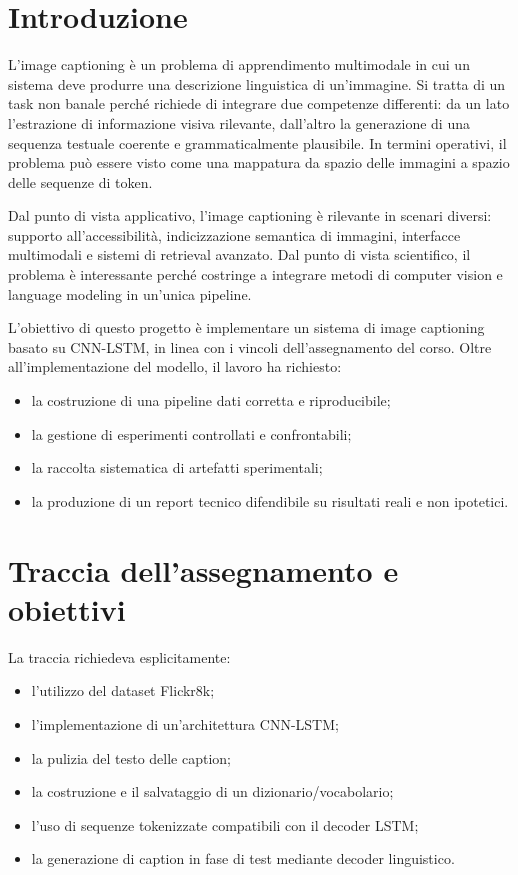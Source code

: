 \documentclass[12pt,a4paper]{article}
\begin{document}
\section{Introduzione}

L'image captioning è un problema di apprendimento multimodale in cui un sistema deve produrre una descrizione linguistica di un'immagine. Si tratta di un task non banale perché richiede di integrare due competenze differenti: da un lato l'estrazione di informazione visiva rilevante, dall'altro la generazione di una sequenza testuale coerente e grammaticalmente plausibile. In termini operativi, il problema può essere visto come una mappatura da spazio delle immagini a spazio delle sequenze di token.

Dal punto di vista applicativo, l'image captioning è rilevante in scenari diversi: supporto all'accessibilità, indicizzazione semantica di immagini, interfacce multimodali e sistemi di retrieval avanzato. Dal punto di vista scientifico, il problema è interessante perché costringe a integrare metodi di computer vision e language modeling in un'unica pipeline.

L'obiettivo di questo progetto è implementare un sistema di image captioning basato su CNN-LSTM, in linea con i vincoli dell'assegnamento del corso. Oltre all'implementazione del modello, il lavoro ha richiesto:
\begin{itemize}[leftmargin=*]
    \item la costruzione di una pipeline dati corretta e riproducibile;
    \item la gestione di esperimenti controllati e confrontabili;
    \item la raccolta sistematica di artefatti sperimentali;
    \item la produzione di un report tecnico difendibile su risultati reali e non ipotetici.
\end{itemize}

\section{Traccia dell'assegnamento e obiettivi}

La traccia richiedeva esplicitamente:
\begin{itemize}[leftmargin=*]
    \item l'utilizzo del dataset Flickr8k;
    \item l'implementazione di un'architettura CNN-LSTM;
    \item la pulizia del testo delle caption;
    \item la costruzione e il salvataggio di un dizionario/vocabolario;
    \item l'uso di sequenze tokenizzate compatibili con il decoder LSTM;
    \item la generazione di caption in fase di test mediante decoder linguistico.
\end{itemize}
\end{document}

